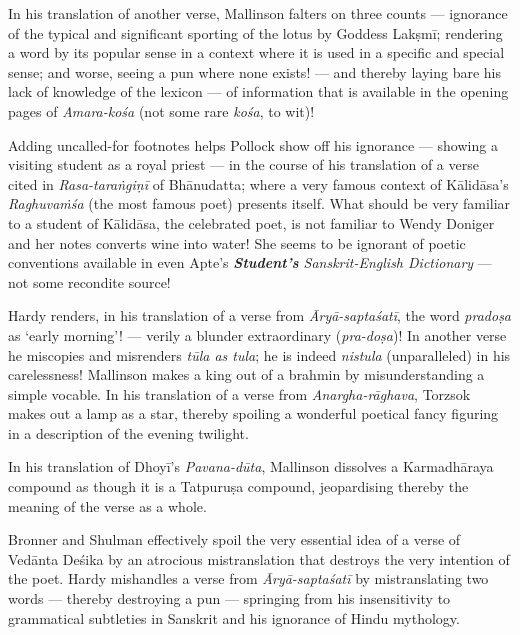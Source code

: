 In his translation of another verse, Mallinson falters on three counts --- ignorance of the typical and significant sporting of the lotus by Goddess Lakṣmī; rendering a word by its popular sense in a context where it is used in a specific and special sense; and worse, seeing a pun where none exists! --- and thereby laying bare his lack of knowledge of the lexicon --- of information that is available in the opening pages of \textsl{Amara-kośa} (not some rare \textsl{kośa}, to wit)!

\eject

Adding uncalled-for footnotes helps Pollock show off his ignorance --- showing a visiting student as a royal priest --- in the course of his translation of a verse cited in \textsl{Rasa-taraṅgiṇī} of Bhānudatta; where a very famous context of Kālidāsa’s \textsl{Raghuvaṁśa} (the most famous poet) presents itself. What should be very familiar to a student of Kālidāsa, the celebrated poet, is not familiar to Wendy Doniger and her notes converts wine into water! She seems to be ignorant of poetic conventions available in even Apte’s \textsl{\textbf{Student’s} Sanskrit-English Dictionary} --- not some recondite source!

Hardy renders, in his translation of a verse from \textsl{Āryā-saptaśatī}, the word \textsl{pradoṣa} as ‘early morning’! --- verily a blunder extraordinary (\textsl{pra-doṣa})! In another verse he miscopies and misrenders \textsl{tūla as tula}; he is indeed \textsl{nistula} (unparalleled) in his carelessness! Mallinson makes a king out of a brahmin by misunderstanding a simple vocable. In his translation of a verse from \textsl{Anargha-rāghava}, Torzsok makes out a lamp as a star, thereby spoiling a wonderful poetical fancy figuring in a description of the evening twilight.

In his translation of Dhoyī’s \textsl{Pavana-dūta}, Mallinson dissolves a Karmadhāraya compound as though it is a Tatpuruṣa compound, jeopardising thereby the meaning of the verse as a whole.

Bronner and Shulman effectively spoil the very essential idea of a verse of Vedānta Deśika by an atrocious mistranslation that destroys the very intention of the poet. Hardy mishandles a verse from \textsl{Āryā-saptaśatī} by mistranslating two words --- thereby destroying a pun --- springing from his insensitivity to grammatical subtleties in Sanskrit and his ignorance of Hindu mythology.

